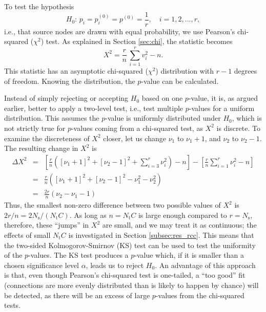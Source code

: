 To test the hypothesis
\begin{equation}\label{eq:null_rcc}
H_0: \, p_i = p_i^{(0)} = p^{(0)} = \frac{1}{r},     \quad i = 1, 2, ..., r, 
\end{equation}
i.e., that source nodes are drawn with equal probability, we use Pearson's chi-squared ($\chi^2$) test. As explained in Section \ref{sec:chi}, the statistic becomes 
\begin{equation}
X^2 = \frac{r}{n} \, \sum_{i=1}^r{ v_i^2 } - n.
\end{equation}
This statistic has an asymptotic chi-squared ($\chi^2$) distribution with $r-1$ degrees of freedom. Knowing the distribution, the $p$-value can be calculated. 

Instead of simply rejecting or accepting $H_0$ based on one $p$-value, it is, as argued earlier, better to apply a two-level test, i.e., test multiple $p$-values for a uniform distribution. This assumes the $p$-value is uniformly distributed under $H_0$, which is not strictly true for $p$-values coming from a chi-squared test, as $X^2$ is discrete. To examine the discreteness of $X^2$ closer, let us change $\nu_1$ to $\nu_1 + 1$, and $\nu_2$ to $\nu_2 - 1$. The resulting change in $X^2$ is 
\begin{eqnarray*}
\Delta X^2 
&=& \left[ \frac{r}{n}\left( [\nu_1+1]^2 + [\nu_2-1]^2 + \sum_{i=3}^r \nu_i^2 \right) - n \right]
  - \left[ \frac{r}{n}\sum_{i=1}^r \nu_i^2 - n \right] \\
&=& \frac{r}{n}\left( [\nu_1+1]^2 + [\nu_2-1]^2 - \nu_1^2 - \nu_2^2\right) \\
&=& \frac{2r}{n}\left(\nu_2 - \nu_1 - 1 \right)
\end{eqnarray*}
Thus, the smallest non-zero difference between two possible values of $X^2$ is $2r / n = 2 N_\text{s} / (N_\text{t} C)$. As long as $n = N_\text{t} C$ is large enough compared to $r = N_\text{s}$, therefore, these ``jumps'' in $X^2$ are small, and we may treat it as continuous; the effects of small $N_\text{t} C$ is investigated in Section \ref{subsec:res_rcc}. This means that the two-sided Kolmogorov-Smirnov (KS) test can be used to test the uniformity of the $p$-values. The KS test produces a $p$-value which, if it is smaller than a chosen significance level $\alpha$, leads us to  reject $H_0$. An advantage of this approach is that, even though Pearson's chi-squared test is one-tailed, a ``too good'' fit (connections are more evenly distributed than is likely to happen by chance) will be detected, as there will be an excess of large $p$-values from the chi-squared tests. 



